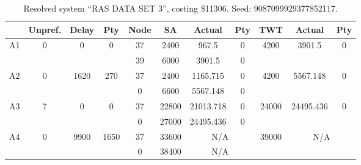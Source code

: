 \begin{sidewaystable}
\footnotesize
\caption{Resolved system ``RAS DATA SET 3'', costing \$11306. Seed: 9087099929377852117.}
\centering
\begin{tabular}{c||c|c|c||c|c|c|c||c|c|c}
  \hline \hline
  &
  Unpref. & 
  Delay &
  Pty &
  Node &
  SA &
  Actual &
  Pty &
  TWT &
  Actual &
  Pty \\
      \hline
      \multirow{2}{*}{A1} &
      \multirow{2}{*}{0} &
      \multirow{2}{*}{0} &
      \multirow{2}{*}{0} &
      37 &
      2400 &
        967.5 &
        0 &
      \multirow{2}{*}{4200} &
        \multirow{2}{*}{3901.5} &
        \multirow{2}{*}{0}
      \\
      \cline{5-8}
       &
       &
       &
       &
      39 &
      6000 &
        3901.5 &
        0 &
      
         &
        
      \\
      \hline
      \multirow{2}{*}{A2} &
      \multirow{2}{*}{0} &
      \multirow{2}{*}{1620} &
      \multirow{2}{*}{270} &
      37 &
      2400 &
        1165.715 &
        0 &
      \multirow{2}{*}{4200} &
        \multirow{2}{*}{5567.148} &
        \multirow{2}{*}{0}
      \\
      \cline{5-8}
       &
       &
       &
       &
      0 &
      6600 &
        5567.148 &
        0 &
      
         &
        
      \\
      \hline
      \multirow{2}{*}{A3} &
      \multirow{2}{*}{7} &
      \multirow{2}{*}{0} &
      \multirow{2}{*}{0} &
      37 &
      22800 &
        21013.718 &
        0 &
      \multirow{2}{*}{24000} &
        \multirow{2}{*}{24495.436} &
        \multirow{2}{*}{0}
      \\
      \cline{5-8}
       &
       &
       &
       &
      0 &
      27000 &
        24495.436 &
        0 &
      
         &
        
      \\
      \hline
      \multirow{2}{*}{A4} &
      \multirow{2}{*}{0} &
      \multirow{2}{*}{9900} &
      \multirow{2}{*}{1650} &
      37 &
      33600 &
        \multicolumn{2}{|c||}{N/A} &
      \multirow{2}{*}{39000} &
        \multicolumn{2}{c}{\multirow{2}{*}{N/A}}
      \\
      \cline{5-8}
       &
       &
       &
       &
      0 &
      38400 &
        \multicolumn{2}{|c||}{N/A} &
      

\end{tabular}
\end{sidewaystable}
